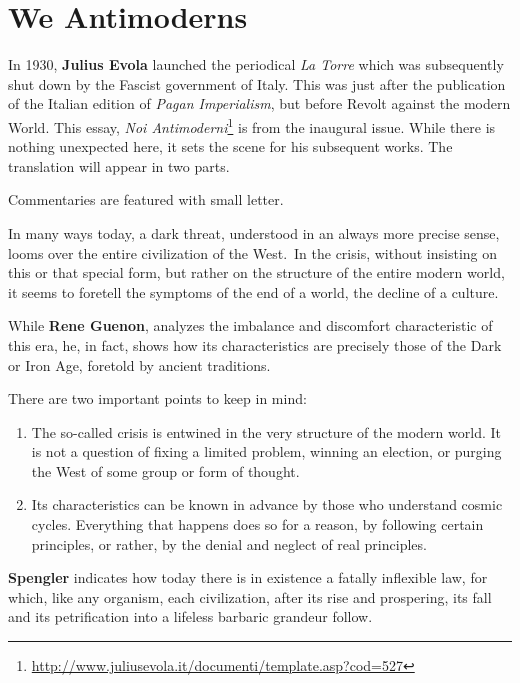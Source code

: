 \section{We Antimoderns}

\begin{quotex}
In 1930, \textbf{Julius Evola} launched the periodical \emph{La Torre} which was subsequently shut down by the Fascist government of Italy. This was just after the publication of the Italian edition of \emph{Pagan Imperialism}, but before Revolt against the modern World. This essay, \textit{Noi Antimoderni}\footnote{\url{http://www.juliusevola.it/documenti/template.asp?cod=527}} is from the inaugural issue. While there is nothing unexpected here, it sets the scene for his subsequent works. The translation will appear in two parts.

Commentaries are featured with small letter.
\end{quotex}

In many ways today, a dark threat, understood in an always more precise sense, looms over the entire civilization of the West. In the crisis, without insisting on this or that special form, but rather on the structure of the entire modern world, it seems to foretell the symptoms of the end of a world, the decline of a culture.

While \textbf{Rene Guenon}, analyzes the imbalance and discomfort characteristic of this era, he, in fact, shows how its characteristics are precisely those of the Dark or Iron Age, foretold by ancient traditions.

\begin{quotex}
There are two important points to keep in mind:

\end{quotex}
\begin{enumerate}
\item \begin{quotex}
The so-called crisis is entwined in the very structure of the modern world. It is not a question of fixing a limited problem, winning an election, or purging the West of some group or form of thought. 
\end{quotex}
\item \begin{quotex}
Its characteristics can be known in advance by those who understand cosmic cycles. Everything that happens does so for a reason, by following certain principles, or rather, by the denial and neglect of real principles. 
\end{quotex}
\end{enumerate}
\textbf{Spengler} indicates how today there is in existence a fatally inflexible law, for which, like any organism, each civilization, after its rise and prospering, its fall and its petrification into a lifeless barbaric grandeur follow. 

